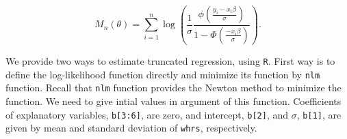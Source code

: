 \documentclass[
  12pt,
]{article}
\newenvironment{Shaded}{\begin{snugshade}}{\end{snugshade}}
\newcommand{\ControlFlowTok}[1]{\textcolor[rgb]{0.13,0.29,0.53}{\textbf{#1}}}
\newcommand{\DataTypeTok}[1]{\textcolor[rgb]{0.13,0.29,0.53}{#1}}
\newcommand{\DecValTok}[1]{\textcolor[rgb]{0.00,0.00,0.81}{#1}}
\newcommand{\KeywordTok}[1]{\textcolor[rgb]{0.13,0.29,0.53}{\textbf{#1}}}
\newcommand{\NormalTok}[1]{#1}
\newcommand{\OperatorTok}[1]{\textcolor[rgb]{0.81,0.36,0.00}{\textbf{#1}}}
\newcommand{\OtherTok}[1]{\textcolor[rgb]{0.56,0.35,0.01}{#1}}
\newcommand{\StringTok}[1]{\textcolor[rgb]{0.31,0.60,0.02}{#1}}
\begin{document}
\begin{equation*}
  M_n(\theta) 
  = \sum_{i=1}^n \log \left( \frac{1}{\sigma} \frac{\phi(\frac{y_i - x_i \beta}{\sigma})}{1 - \Phi(\frac{- x_i \beta}{\sigma})} \right).
\end{equation*}

We provide two ways to estimate truncated regression, using \texttt{R}.
First way is to define the log-likelihood function directly and minimize
its function by \texttt{nlm} function. Recall that \texttt{nlm} function
provides the Newton method to minimize the function. We need to give
intial values in argument of this function. Coefficients of explanatory
variables, \texttt{b{[}3:6{]}}, are zero, and intercept,
\texttt{b{[}2{]}}, and \(\sigma\), \texttt{b{[}1{]}}, are given by mean
and standard deviation of \texttt{whrs}, respectively.

\begin{Shaded}
\end{Shaded}
\end{document}
